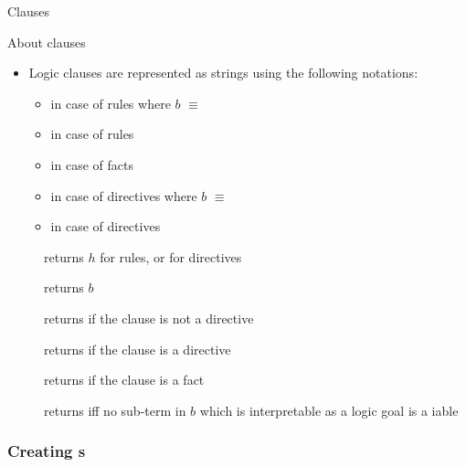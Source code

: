 \documentclass[handout]{beamer}
\begin{document}
\begin{frame}[allowframebreaks]{Clauses}
\begin{alertblock}{About clauses}
\begin{itemize}
            \item Logic clauses are represented as strings using the following notations:
            \begin{itemize}
                \item {} in case of rules where $b$ $\equiv$ 
                \item {} in case of rules
                \item {} in case of facts
                \item {} in case of directives where $b$ $\equiv$ 
                \item {} in case of directives
            \end{itemize}
        \end{itemize}
    \end{alertblock}
    \framebreak
    \begin{description}
        \item[] returns $h$ for rules, or  for directives
        \item[] returns $b$
        \item[] returns  if the clause is not a directive
        \item[] returns  if the clause is a directive
        \item[] returns  if the clause is a fact
        \item[] returns  iff no sub-term in $b$ which is interpretable as a logic goal is a iable
    \end{description}

    \framebreak

\end{frame}

\subsubsection{Creating s}
\end{document}
